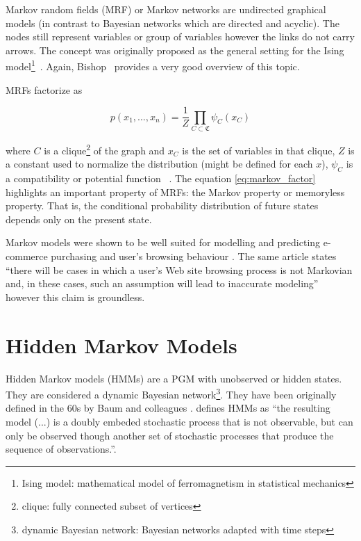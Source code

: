 Markov random fields (MRF) or Markov networks are undirected graphical models 
\cite{Kindermann1980} (in contrast to Bayesian networks which are directed and 
acyclic). The nodes still represent variables or group of variables however the 
links do not carry arrows. The concept was originally proposed as the general 
setting for the Ising model\footnote{Ising model: mathematical model of 
ferromagnetism in statistical mechanics}~\cite{Kindermann1980}. Again, 
Bishop~\cite{bishop2006pattern} provides a very good overview of this topic. 

MRFs factorize as

\begin{equation}
p(x_{1}, ..., x_{n}) = \frac{1}{Z} \prod_{C \subset \mathfrak{C}}^{} 
\psi_{C}(x_{C}) \label{eq:markov_factor}
\end{equation}

where $ C $ is a clique\footnote{clique: fully connected subset of vertices} of 
the graph and $ x_{C} $ is the set of variables in that clique, $ Z $ is a 
constant used to normalize the distribution (might be defined for each $ x $), 
$ \psi_{C} $ is a compatibility or potential function~\cite[section 
2.1.2]{Wainwright2008} \cite[section 8.3]{bishop2006pattern}. The equation 
\ref{eq:markov_factor} highlights an important property of MRFs: the Markov 
property or memoryless property. That is, the conditional probability 
distribution of future states depends only on the present state. 

Markov models were shown to be well suited for modelling and predicting 
e-commerce purchasing and user's browsing behaviour \cite{Deshpande2001}. The 
same article states ``there will be cases in which a user’s Web site
browsing process is not Markovian and, in these cases, such an assumption will
lead to inaccurate modeling'' however this claim is groundless.

\section{Hidden Markov Models}

Hidden Markov models (HMMs) are a PGM with unobserved or hidden states. They 
are considered a dynamic Bayesian network\footnote{dynamic Bayesian network: 
Bayesian networks adapted with time steps}. They have been originally defined 
in the 60s by Baum and colleagues \cite{Baum1966}. \cite{Rabiner1989} defines 
HMMs as ``the resulting model (...) is a doubly embeded stochastic process that 
is not observable, but can only be observed though another set of stochastic 
processes that produce the sequence of observations.''.

